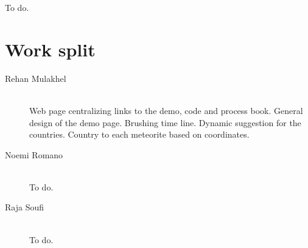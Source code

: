 \documentclass[10pt,conference,compsocconf]{IEEEtran}
\begin{document}
To do.

\section{Work split}
\label{sec:work_split}

\begin{description}
\item[Rehan Mulakhel] \ \\
  Web page centralizing links to the demo, code and process book. General design of the demo page. Brushing time line. Dynamic suggestion for the countries. Country to each meteorite based on coordinates.
\item[Noemi Romano] \ \\
  To do.
\item[Raja Soufi] \ \\
  To do.
\end{description}
\end{document}
